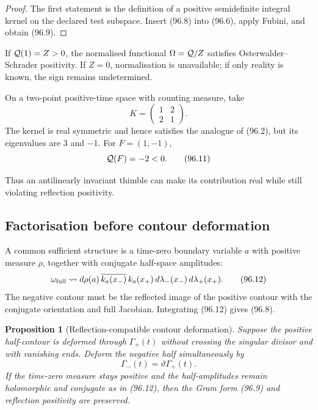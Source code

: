 \documentclass[11pt]{article}
\newtheorem{proposition}[theorem]{Proposition}
\begin{document}
\begin{proof}
The first statement is the definition of a positive semidefinite
integral kernel on the declared test subspace.  Insert (96.8) into
(96.6), apply Fubini, and obtain (96.9).
\end{proof}

If \({\cal Q}(1)=Z>0\), the normalised functional
\(\Omega={\cal Q}/Z\) satisfies Osterwalder--Schrader positivity.
If \(Z=0\), normalisation is unavailable; if only reality is known,
the sign remains undetermined.

\begin{counterexample}
\label{cnt:v11v96-real-not-positive}
On a two-point positive-time space with counting measure, take
\[
                              K=\begin{pmatrix}1&2\\2&1\end{pmatrix}.
                                                                    \tag{96.10}
\]
The kernel is real symmetric and hence satisfies the analogue of
(96.2), but its eigenvalues are \(3\) and \(-1\).  For
\(F=(1,-1)\),
\[
                              {\cal Q}(F)=-2<0.               \tag{96.11}
\]
\end{counterexample}

Thus an antilinearly invariant thimble can make its contribution real
while still violating reflection positivity.

\subsection{Factorisation before contour deformation}

A common sufficient structure is a time-zero boundary variable
\(a\) with positive measure \(\rho\), together with conjugate
half-space amplitudes:
\[
 \omega_{\rm full}
 \leadsto
 d\rho(a)\,
 \overline{k_a(x_-)}\,k_a(x_+)\,
 d\lambda_-(x_-)\,d\lambda_+(x_+).                          \tag{96.12}
\]
The negative contour must be the reflected image of the positive
contour with the conjugate orientation and full Jacobian.  Integrating
(96.12) gives (96.8).

\begin{proposition}[Reflection-compatible contour deformation]
\label{prop:v11v96-deform}
Suppose the positive half-contour is deformed through
\(\Gamma_+(t)\) without crossing the singular divisor and with
vanishing ends.  Deform the negative half simultaneously by
\[
                              \Gamma_-(t)=\vartheta\Gamma_+(t).
                                                                    \tag{96.13}
\]
If the time-zero measure stays positive and the half-amplitudes remain
holomorphic and conjugate as in (96.12), then the Gram form
(96.9) and reflection positivity are preserved.
\end{proposition}
\end{document}

